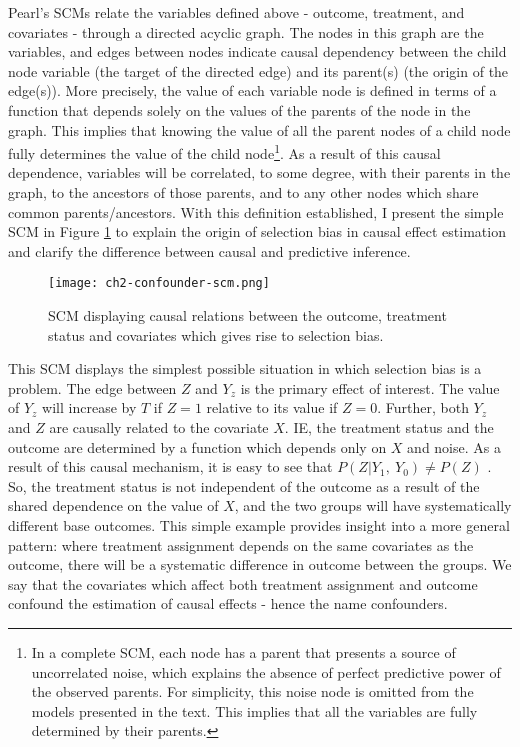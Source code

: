 \documentclass[../main.tex]{subfiles}
\begin{document}
\vspace{\baselineskip}
Pearl’s SCMs relate the variables defined above - outcome, treatment, and covariates - through a directed acyclic graph. The nodes in this graph are the variables, and edges between nodes indicate causal dependency between the child node variable (the target of the directed edge) and its parent(s) (the origin of the edge(s)). More precisely, the value of each variable node is defined in terms of a function that depends solely on the values of the parents of the node in the graph. This implies that knowing the value of all the parent nodes of a child node fully determines the value of the child node\footnote{ In a complete SCM, each node has a parent that presents a source of uncorrelated noise, which explains the absence of perfect predictive power of the observed parents. For simplicity, this noise node is omitted from the models presented in the text. This implies that all the variables are fully determined by their parents. }. As a result of this causal dependence, variables will be correlated, to some degree, with their parents in the graph, to the ancestors of those parents, and to any other nodes which share common parents/ancestors. With this definition established, I present the simple SCM in Figure \ref{fig:confounder-scm} to explain the origin of selection bias in causal effect estimation and clarify the difference between causal and predictive inference.

\vspace{\baselineskip}

\begin{figure}[ht!]
    \centering
    \texttt{[image: ch2-confounder-scm.png]}
    \caption{SCM displaying causal relations between the outcome, treatment status and covariates which gives rise to selection bias.}
    \label{fig:confounder-scm}
\end{figure}

This SCM displays the simplest possible situation in which selection bias is a problem. The edge between  \( Z \) and  \( Y_{z} \) is the primary effect of interest. The value of  \( Y_{z} \) will increase by  \( T \) if  \( Z=1 \) relative to its value if  \( Z=0 \). Further, both  \( Y_{z} \) and  \( Z \) are causally related to the covariate  \( X. \)  IE, the treatment status and the outcome are determined by a function which depends only on  \( X \) and noise. As a result of this causal mechanism, it is easy to see that \( P \left( Z  \vert  Y_{1},~Y_{0} \right)   \neq  P \left( Z \right)  \) . So, the treatment status is not independent of the outcome as a result of the shared dependence on the value of  \( X \), and the two groups will have systematically different base outcomes. This simple example provides insight into a more general pattern: where treatment assignment depends on the same covariates as the outcome, there will be a systematic difference in outcome between the groups. We say that the covariates which affect both treatment assignment and outcome confound the estimation of causal effects - hence the name confounders.
\end{document}
